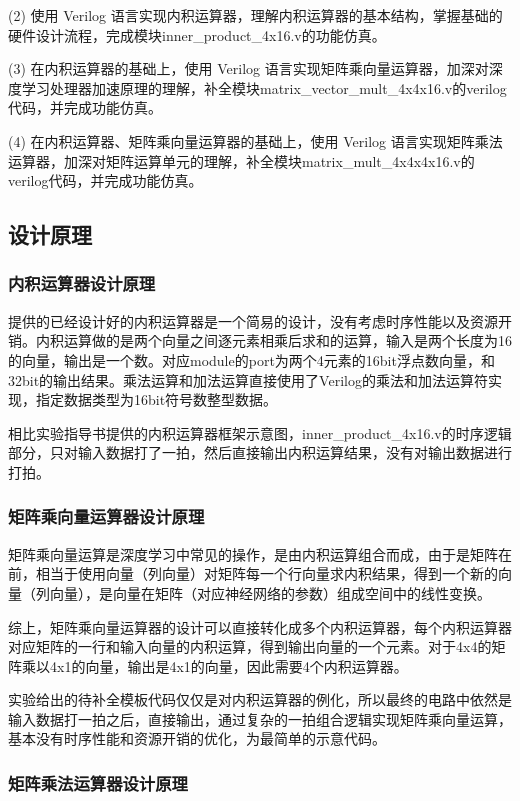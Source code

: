 \documentclass[10pt]{article}
\begin{document}
(2) 使用 Verilog 语言实现内积运算器，理解内积运算器的基本结构，掌握基础的硬件设计流程，完成模块inner\_product\_4x16.v的功能仿真。

(3) 在内积运算器的基础上，使用 Verilog 语言实现矩阵乘向量运算器，加深对深度学习处理器加速原理的理解，补全模块matrix\_vector\_mult\_4x4x16.v的verilog代码，并完成功能仿真。

(4) 在内积运算器、矩阵乘向量运算器的基础上，使用 Verilog 语言实现矩阵乘法运算器，加深对矩阵运算单元的理解，补全模块matrix\_mult\_4x4x4x16.v的verilog代码，并完成功能仿真。

\subsection{设计原理}

\subsubsection{内积运算器设计原理}
提供的已经设计好的内积运算器是一个简易的设计，没有考虑时序性能以及资源开销。内积运算做的是两个向量之间逐元素相乘后求和的运算，输入是两个长度为16的向量，输出是一个数。对应module的port为两个4元素的16bit浮点数向量，和32bit的输出结果。乘法运算和加法运算直接使用了Verilog的乘法和加法运算符实现，指定数据类型为16bit符号数整型数据。

相比实验指导书提供的内积运算器框架示意图，inner\_product\_4x16.v的时序逻辑部分，只对输入数据打了一拍，然后直接输出内积运算结果，没有对输出数据进行打拍。

\subsubsection{矩阵乘向量运算器设计原理}
矩阵乘向量运算是深度学习中常见的操作，是由内积运算组合而成，由于是矩阵在前，相当于使用向量（列向量）对矩阵每一个行向量求内积结果，得到一个新的向量（列向量），是向量在矩阵（对应神经网络的参数）组成空间中的线性变换。

综上，矩阵乘向量运算器的设计可以直接转化成多个内积运算器，每个内积运算器对应矩阵的一行和输入向量的内积运算，得到输出向量的一个元素。对于4x4的矩阵乘以4x1的向量，输出是4x1的向量，因此需要4个内积运算器。

实验给出的待补全模板代码仅仅是对内积运算器的例化，所以最终的电路中依然是输入数据打一拍之后，直接输出，通过复杂的一拍组合逻辑实现矩阵乘向量运算，基本没有时序性能和资源开销的优化，为最简单的示意代码。

\subsubsection{矩阵乘法运算器设计原理}
\end{document}
